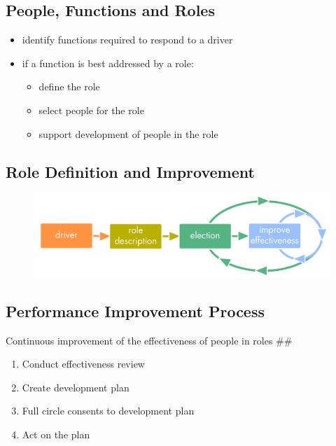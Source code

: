 \subsection{People, Functions and Roles}
\label{peoplefunctionsandroles}

\begin{itemize}
\item identify functions required to respond to a driver

\item if a function is best addressed by a role:

\begin{itemize}
\item define the role

\item select people for the role

\item support development of people in the role

\end{itemize}

\end{itemize}

\subsection{Role Definition and Improvement}
\label{roledefinitionandimprovement}

\begin{figure}[htbp]
\centering
\includegraphics[keepaspectratio,width=\textwidth,height=0.75\textheight]{img/people-and-roles/role-improvement.png}
\end{figure}

\subsection{Performance Improvement Process}
\label{performanceimprovementprocess}

Continuous improvement of the effectiveness of people in roles \#\#

\begin{enumerate}
\item Conduct effectiveness review

\item Create development plan

\item Full circle consents to development plan

\item Act on the plan

\end{enumerate}

